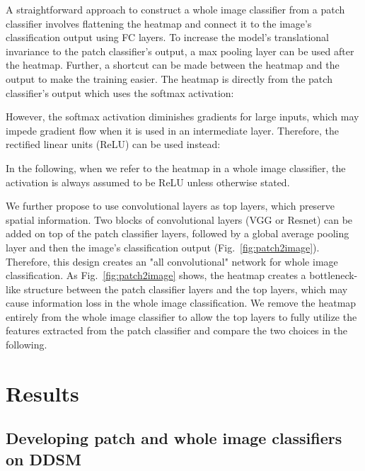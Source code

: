 \documentclass[12pt,letterpaper]{article}
\begin{document}
A straightforward approach to construct a whole image classifier from a patch classifier involves flattening the heatmap and connect it to the image's classification output using FC layers. To increase the model's translational invariance to the patch classifier's output, a max pooling layer can be used after the heatmap. Further, a shortcut can be made between the heatmap and the output to make the training easier. The heatmap is directly from the patch classifier's output which uses the softmax activation:

However, the softmax activation diminishes gradients for large inputs, which may impede gradient flow when it is used in an intermediate layer. Therefore, the rectified linear units (ReLU) can be used instead:

In the following, when we refer to the heatmap in a whole image classifier, the activation is always assumed to be ReLU unless otherwise stated.

We further propose to use convolutional layers as top layers, which preserve spatial information. Two blocks of convolutional layers (VGG or Resnet) can be added on top of the patch classifier layers, followed by a global average pooling layer and then the image's classification output (Fig.~\ref{fig:patch2image}). Therefore, this design creates an "all convolutional" network for whole image classification. As Fig.~\ref{fig:patch2image} shows, the heatmap creates a bottleneck-like structure between the patch classifier layers and the top layers, which may cause information loss in the whole image classification. We remove the heatmap entirely from the whole image classifier to allow the top layers to fully utilize the features extracted from the patch classifier and compare the two choices in the following.

\section{Results}
\label{results}
\subsection{Developing patch and whole image classifiers on DDSM}
\end{document}
